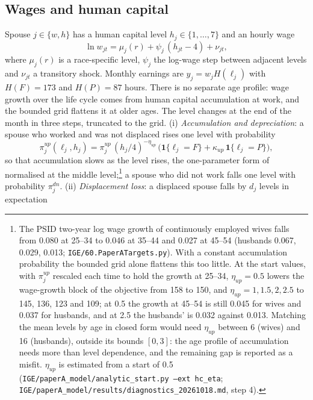 \subsection{Wages and human capital}

Spouse $j \in \{w, h\}$ has a human capital level $h_j \in \{1, \dots, 7\}$ and an hourly wage
\begin{equation}\label{eq:wage}
  \ln w_{jt} = \mu_j(r) + \psi_j\,(h_{jt} - 4) + \nu_{jt},
\end{equation}
where $\mu_j(r)$ is a race-specific level, $\psi_j$ the log-wage step between adjacent levels and $\nu_{jt}$ a
transitory shock. Monthly earnings are $y_j = w_j H(\ell_j)$ with $H(F) = 173$ and $H(P) = 87$ hours. There is no
separate age profile: wage growth over the life cycle comes from human capital accumulation at work, and the bounded
grid flattens it at older ages. The level changes at the end of the month in three steps, truncated to the grid. (i)
\emph{Accumulation and depreciation}: a spouse who worked and was not displaced rises one level with probability
\[
  \pi^{up}_j(\ell_j, h_j) = \pi^{up}_j\,(h_j/4)^{-\eta_{up}}\,\big(\mathbf{1}\{\ell_j = F\} + \kappa_{up}\,\mathbf{1}\{\ell_j = P\}\big),
\]
so that accumulation slows as the level rises, the one-parameter form of \citet{bacher2025joint} normalised at the
middle level;\footnote{The PSID two-year log wage growth of continuously employed wives falls from 0.080 at 25--34 to
0.046 at 35--44 and 0.027 at 45--54 (husbands 0.067, 0.029, 0.013; \texttt{IGE/60.PaperATargets.py}). With a constant
accumulation probability the bounded grid alone flattens this too little. At the start values, with $\pi^{up}_j$
rescaled each time to hold the growth at 25--34, $\eta_{up} = 0.5$ lowers the wage-growth block of the objective from
158 to 150, and $\eta_{up} = 1, 1.5, 2, 2.5$ to 145, 136, 123 and 109; at 0.5 the growth at 45--54 is still 0.045 for
wives and 0.037 for husbands, and at 2.5 the husbands' is 0.032 against 0.013. Matching the mean levels by age in
closed form would need $\eta_{up}$ between 6 (wives) and 16 (husbands), outside its bounds $[0, 3]$: the age profile
of accumulation needs more than level dependence, and the remaining gap is reported as a misfit. $\eta_{up}$ is
estimated from a start of 0.5 (\texttt{IGE/paperA\_model/analytic\_start.py --ext hc\_eta};
\texttt{IGE/paperA\_model/results/diagnostics\_20261018.md}, step 4).} a spouse who did not work falls one level with
probability $\pi^{dn}_j$. (ii) \emph{Displacement loss}: a displaced spouse falls by $d_j$ levels in expectation
